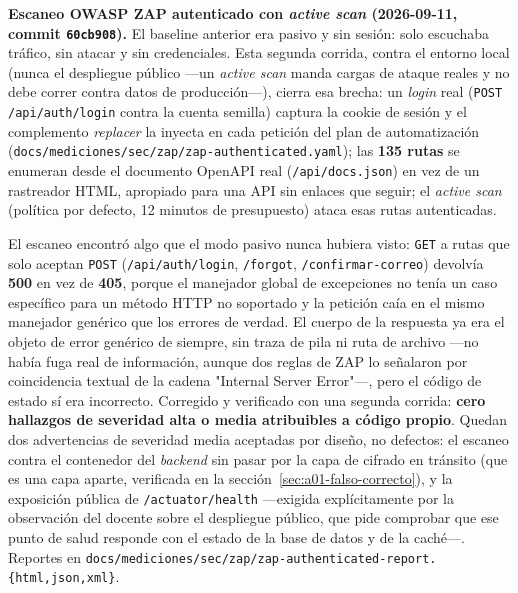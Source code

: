 \documentclass[11pt,a4paper]{article}
\newcommand{\ruta}[1]{\texttt{\footnotesize #1}}
\begin{document}
\textbf{Escaneo OWASP ZAP autenticado con \emph{active scan}
(2026-09-11, commit \texttt{60cb908}).} El baseline anterior era pasivo
y sin sesión: solo escuchaba tráfico, sin atacar y sin credenciales. Esta
segunda corrida, contra el entorno local (nunca el despliegue público
—un \emph{active scan} manda cargas de ataque reales y no debe correr
contra datos de producción—), cierra esa brecha: un
\emph{login} real (\texttt{POST /api/auth/login} contra la cuenta
semilla) captura la cookie de sesión y el complemento \emph{replacer} la
inyecta en cada petición del plan de automatización
(\ruta{docs/mediciones/sec/zap/zap-authenticated.yaml}); las
\textbf{135 rutas} se enumeran desde el documento OpenAPI real
(\texttt{/api/docs.json}) en vez de un rastreador HTML, apropiado para
una API sin enlaces que seguir; el \emph{active scan} (política por
defecto, 12 minutos de presupuesto) ataca esas rutas autenticadas.

El escaneo encontró algo que el modo pasivo nunca hubiera visto:
\texttt{GET} a rutas que solo aceptan \texttt{POST}
(\texttt{/api/auth/login}, \texttt{/forgot}, \texttt{/confirmar-correo})
devolvía \textbf{500} en vez de \textbf{405}, porque el manejador global
de excepciones no tenía un caso específico para un método HTTP no
soportado y la petición caía en el mismo manejador genérico que los
errores de verdad. El cuerpo de la respuesta ya era el objeto de error
genérico de siempre, sin traza de pila ni ruta de archivo —no había fuga
real de información, aunque dos reglas de ZAP lo señalaron por
coincidencia textual de la cadena "Internal Server Error"—, pero el
código de estado sí era incorrecto. Corregido y verificado con una
segunda corrida: \textbf{cero hallazgos de severidad alta o media
atribuibles a código propio}. Quedan dos advertencias de severidad media
aceptadas por diseño, no defectos: el escaneo contra el contenedor del
\emph{backend} sin pasar por la capa de cifrado en tránsito (que es una
capa aparte, verificada en la sección~\ref{sec:a01-falso-correcto}), y la
exposición pública de \texttt{/actuator/health} —exigida explícitamente
por la observación del docente sobre el despliegue público, que pide
comprobar que ese punto de salud responde con el estado de la base de
datos y de la caché—. Reportes en
\ruta{docs/mediciones/sec/zap/zap-authenticated-report.\{html,json,xml\}}.
\end{document}
